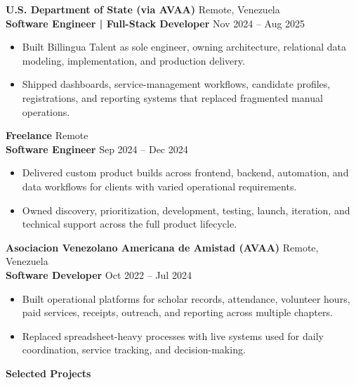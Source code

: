 \documentclass[11pt]{article}
\begin{document}
\vspace{10pt}

\textbf{U.S. Department of State (via AVAA)} \hfill Remote, Venezuela \\
\textbf{Software Engineer | Full-Stack Developer} \hfill Nov 2024 -- Aug 2025
\begin{itemize}
    \item Built Billingua Talent as sole engineer, owning architecture, relational data modeling, implementation, and production delivery.
    \item Shipped dashboards, service-management workflows, candidate profiles, registrations, and reporting systems that replaced fragmented manual operations.
\end{itemize}

\vspace{10pt}

\textbf{Freelance} \hfill Remote \\
\textbf{Software Engineer} \hfill Sep 2024 -- Dec 2024
\begin{itemize}
    \item Delivered custom product builds across frontend, backend, automation, and data workflows for clients with varied operational requirements.
    \item Owned discovery, prioritization, development, testing, launch, iteration, and technical support across the full product lifecycle.
\end{itemize}

\vspace{10pt}

\textbf{Asociacion Venezolano Americana de Amistad (AVAA)} \hfill Remote, Venezuela \\
\textbf{Software Developer} \hfill Oct 2022 -- Jul 2024
\begin{itemize}
    \item Built operational platforms for scholar records, attendance, volunteer hours, paid services, receipts, outreach, and reporting across multiple chapters.
    \item Replaced spreadsheet-heavy processes with live systems used for daily coordination, service tracking, and decision-making.
\end{itemize}

\begin{center}
    \textbf{Selected Projects}
\end{center}
\end{document}
